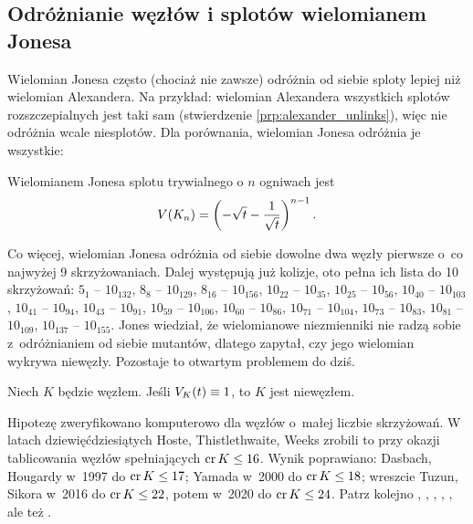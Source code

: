 
\subsection{Odróżnianie węzłów i splotów wielomianem Jonesa}
Wielomian Jonesa często (chociaż nie zawsze) odróżnia od siebie sploty lepiej niż wielomian Alexandera.
Na przykład: wielomian Alexandera wszystkich splotów rozszczepialnych jest taki sam (stwierdzenie \ref{prp:alexander_unlinks}), więc nie odróżnia wcale niesplotów.
Dla porównania, wielomian Jonesa odróżnia je wszystkie:

\begin{proposition}
\label{prp:jones_trivial_link}%
    Wielomianem Jonesa splotu trywialnego o $n$ ogniwach jest
    \begin{equation}
        V(K_n) = \left(-\sqrt{t} - \frac{1}{\sqrt {t}}\right)^{n-1}.
    \end{equation}
\end{proposition}

Co więcej, wielomian Jonesa odróżnia od siebie dowolne dwa węzły pierwsze o~co najwyżej 9 skrzyżowaniach.
Dalej występują już kolizje, oto pełna ich lista do 10 skrzyżowań:
$5_{1}$ -- $10_{132}$,
$8_{8}$ -- $10_{129}$,
$8_{16}$ -- $10_{156}$,
$10_{22}$ -- $10_{35}$,
$10_{25}$ -- $10_{56}$,
$10_{40}$ -- $10_{103}$,
$10_{41}$ -- $10_{94}$,
$10_{43}$ -- $10_{91}$,
$10_{59}$ -- $10_{106}$,
$10_{60}$ -- $10_{86}$,
$10_{71}$ -- $10_{104}$,
$10_{73}$ -- $10_{83}$,
$10_{81}$ -- $10_{109}$,
$10_{137}$ -- $10_{155}$.
Jones wiedział, że wielomianowe niezmienniki nie radzą sobie z~odróżnianiem od siebie mutantów, dlatego zapytał, czy jego wielomian wykrywa niewęzły.
Pozostaje to otwartym problemem do dziś.

\begin{conjecture}
%
\label{con:jones}%
    Niech $K$ będzie węzłem.
    Jeśli $V_K(t) \equiv 1$, to $K$ jest niewęzłem.
\end{conjecture}

Hipotezę zweryfikowano komputerowo dla węzłów o~małej liczbie skrzyżowań.
W latach dziewięćdziesiątych Hoste, Thistlethwaite, Weeks zrobili to przy okazji tablicowania węzłów spełniających $\operatorname{cr} K \le 16$.
%
%
%
Wynik poprawiano: Dasbach, Hougardy w~1997 do $\operatorname{cr} K \le 17$; Yamada w~2000 do $\operatorname{cr} K \le 18$; wreszcie Tuzun, Sikora w~2016 do $\operatorname{cr} K \le 22$, potem w~2020 do $\operatorname{cr} K \le 24$.
Patrz kolejno \cite{thistlethwaite98}, \cite{hougardy97}, \cite{yamada00}, \cite{tuzun18}, \cite{tuzun21}, ale też \cite[s. 381]{ohtsuki02}.
%
%
%
%
%

